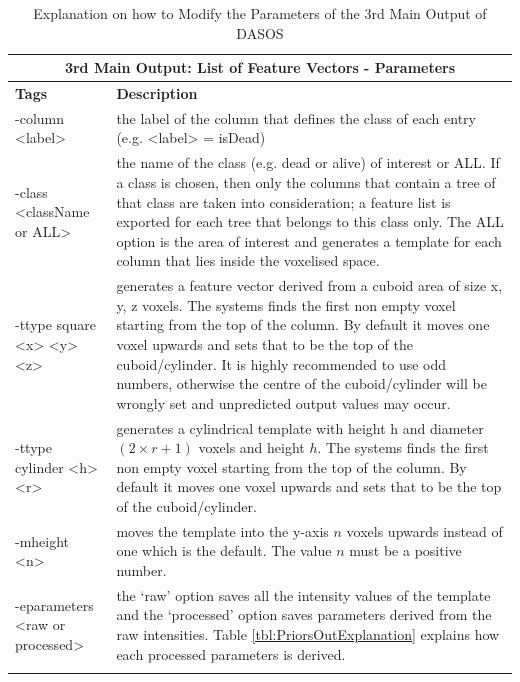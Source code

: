\documentclass{subfiles}
\begin{document}
			\begin{longtable}
				{|p{3.1cm}|p{11cm}|}
				
				\toprule
				\multicolumn{2}{|c|}{\textbf{3rd Main Output: List of Feature Vectors - Parameters }} \\
				\midrule
				
				\textbf{Tags} & \textbf{Description} \\ 
				\cmidrule(r){1-1}\cmidrule(l){2-2}
				-column <label> & the label of the column that defines the class of each entry (e.g. <label> = isDead) \\
				\cmidrule(r){1-1}\cmidrule(l){2-2}
				-class <className or ALL> & the name of the class (e.g. dead or alive) of interest or ALL. If a class is chosen, then only the columns that contain a tree of that class are taken into consideration; a feature list is exported for each tree that belongs to this class only. The ALL option is the area of interest and generates a template for each column that lies inside the voxelised space. \\
				
				\cmidrule(r){1-1}\cmidrule(l){2-2}
				-ttype  square <x> <y> <z> & generates a feature vector derived from a cuboid area of size x, y, z voxels. The systems finds the first non empty voxel starting from the top of the column. By default it moves one voxel upwards and sets that to be the top of the cuboid/cylinder. It is highly recommended to use odd numbers, otherwise the centre of the cuboid/cylinder will be wrongly set and unpredicted output values may occur. 		\\		
				\cmidrule(r){1-1}\cmidrule(l){2-2}
				-ttype cylinder <h> <r> & generates a cylindrical template with height h and diameter $(2 \times r + 1)$ voxels and height $h$. The systems finds the first non empty voxel starting from the top of the column. By default it moves one voxel upwards and sets that to be the top of the cuboid/cylinder. \\
				\cmidrule(r){1-1}\cmidrule(l){2-2}
				-mheight <n> & moves the template into the y-axis $n$ voxels upwards instead of one which is the default. The value $n$ must be a positive number.\\
				\cmidrule(r){1-1}\cmidrule(l){2-2}
				-eparameters <raw or processed> & the ‘raw’ option saves all the intensity values of the template and the ‘processed’ option saves parameters derived from the raw intensities. Table \ref{tbl:PriorsOutExplanation} explains how each processed parameters is derived. \\
				\bottomrule
				\caption[DASOS's functionalities]{Explanation on how to Modify the Parameters of the 3rd Main Output of DASOS}
				\label{tbl:PriorsParameters}	
			\end{longtable}
			
\end{document}
